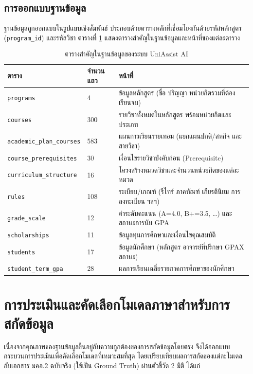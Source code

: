 \subsection{การออกแบบฐานข้อมูล}

ฐานข้อมูลถูกออกแบบในรูปแบบเชิงสัมพันธ์ ประกอบด้วยตารางหลักที่เชื่อมโยงกันด้วยรหัสหลักสูตร (\texttt{program\_id}) และรหัสวิชา ตารางที่ \ref{tab:schema} แสดงตารางสำคัญในฐานข้อมูลและหน้าที่ของแต่ละตาราง

\begin{table}[ht]
    \centering
    \caption{ตารางสำคัญในฐานข้อมูลของระบบ UniAssist AI}
    \label{tab:schema}
    \begin{tabularx}{\linewidth}{l l X}
        \toprule
        \textbf{ตาราง} & \textbf{จำนวนแถว} & \textbf{หน้าที่} \\
        \midrule
        \texttt{programs} & 4 & ข้อมูลหลักสูตร (ชื่อ ปริญญา หน่วยกิตรวมที่ต้องเรียนจบ) \\
        \texttt{courses} & 300 & รายวิชาทั้งหมดในหลักสูตร พร้อมหน่วยกิตและประเภท \\
        \texttt{academic\_plan\_courses} & 583 & แผนการเรียนรายเทอม (แยกแผนปกติ/สหกิจ และสายวิชา) \\
        \texttt{course\_prerequisites} & 30 & เงื่อนไขรายวิชาบังคับก่อน (Prerequisite) \\
        \texttt{curriculum\_structure} & 16 & โครงสร้างหมวดวิชาและจำนวนหน่วยกิตของแต่ละหมวด \\
        \texttt{rules} & 108 & ระเบียบ/เกณฑ์ (รีไทร์ ภาคทัณฑ์ เกียรตินิยม การลงทะเบียน ฯลฯ) \\
        \texttt{grade\_scale} & 12 & ค่าระดับคะแนน (A=4.0, B+=3.5, \ldots) และสถานะการนับ GPA \\
        \texttt{scholarships} & 11 & ข้อมูลทุนการศึกษาและเงื่อนไขคุณสมบัติ \\
        \texttt{students} & 17 & ข้อมูลนักศึกษา (หลักสูตร อาจารย์ที่ปรึกษา GPAX สถานะ) \\
        \texttt{student\_term\_gpa} & 28 & ผลการเรียนเฉลี่ยรายภาคการศึกษาของนักศึกษา \\
        \bottomrule
    \end{tabularx}
\end{table}

\section{การประเมินและคัดเลือกโมเดลภาษาสำหรับการสกัดข้อมูล}

เนื่องจากคุณภาพของฐานข้อมูลขึ้นอยู่กับความถูกต้องของการสกัดข้อมูลโดยตรง จึงได้ออกแบบกระบวนการประเมินเพื่อคัดเลือกโมเดลที่เหมาะสมที่สุด โดยเปรียบเทียบผลการสกัดของแต่ละโมเดลกับเอกสาร มคอ.2 ฉบับจริง (ใช้เป็น Ground Truth) ผ่านตัวชี้วัด 2 มิติ ได้แก่

